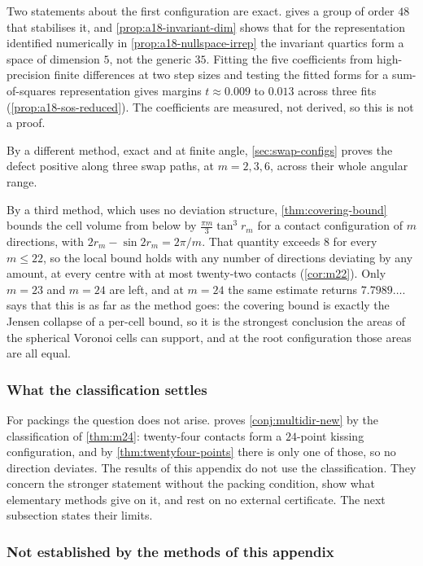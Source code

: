\documentclass[11pt,reqno]{amsart}
\renewcommand{\_}{\origunderscore\allowbreak}
\numberwithin{equation}{section}
\theoremstyle{plain}
\theoremstyle{definition}
\theoremstyle{remark}
\begin{document}
Two statements about the first configuration are exact.
 gives a group of order $48$ that stabilises
it, and \cref{prop:a18-invariant-dim} shows that for the representation
identified numerically in \cref{prop:a18-nullspace-irrep} the invariant
quartics form a space of dimension $5$, not the generic $35$. Fitting the
five coefficients from high-precision finite differences at two step
sizes and testing the fitted forms for a sum-of-squares representation
gives margins $t\approx0.009$ to $0.013$ across three fits
(\cref{prop:a18-sos-reduced}). The coefficients are measured, not
derived, so this is not a proof.

By a different method, exact and at finite angle,
\cref{sec:swap-configs} proves the defect positive along three swap
paths, at $m=2,3,6$, across their whole angular range.

By a third method, which uses no deviation structure,
\cref{thm:covering-bound} bounds the cell volume from below by
$\tfrac{\pi m}{3}\tan^3r_m$ for a contact configuration of $m$
directions, with $2r_m-\sin2r_m=2\pi/m$. That quantity exceeds $8$ for
every $m\le22$, so the local bound holds with any number of
directions deviating by any amount, at every centre with at most
twenty-two contacts (\cref{cor:m22}). Only $m=23$ and $m=24$ are left,
and at $m=24$ the same estimate returns $7.7989\ldots$.
 says that this is as far as the method goes:
the covering bound is exactly the Jensen collapse of a per-cell bound,
so it is the strongest conclusion the areas of the spherical Voronoi
cells can support, and at the root configuration those areas are all
equal.

\subsubsection{What the classification settles}

For packings the question does not arise. 
proves \cref{conj:multidir-new} by the classification of \cref{thm:m24}:
twenty-four contacts form a $24$-point kissing configuration, and by
\cref{thm:twentyfour-points} there is only one of those, so no direction
deviates. The results of this appendix do not use the classification.
They concern the stronger statement without the packing condition, show
what elementary methods give on it, and rest on no external certificate.
The next subsection states their limits.

\subsubsection{Not established by the methods of this appendix}
\end{document}
